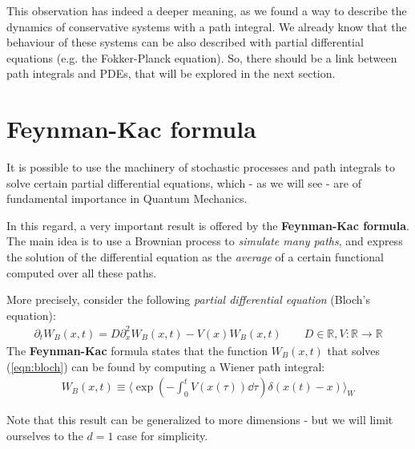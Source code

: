 \documentclass[../template.tex]{subfiles}
\begin{document}
 \medskip

 This observation has indeed a deeper meaning, as we found a way to describe the dynamics of conservative systems with a path integral. We already know that the behaviour of these systems can be also described with partial differential equations (e.g. the Fokker-Planck equation). So, there should be a link between path integrals and PDEs, that will be explored in the next section.

\section{Feynman-Kac formula}
It is possible to use the machinery of stochastic processes and path integrals to solve certain partial differential equations, which - as we will see - are of fundamental importance in Quantum Mechanics.

In this regard, a very important result is offered by the \textbf{Feynman-Kac formula}. The main idea is to use a Brownian process to \textit{simulate many paths}, and express the solution of the differential equation as the \textit{average} of a certain functional computed over all these paths. 

More precisely, consider the following \textit{partial differential equation} (Bloch's equation): 
\begin{align}
    \partial_t W_B(x,t) = D \partial_x^2 W_B(x,t) - V(x) W_B(x,t) \qquad D \in \mathbb{R}, V\colon \mathbb{R} \to \mathbb{R}  
    \label{eqn:bloch}
\end{align}
The \textbf{Feynman-Kac} formula states that the function $W_B(x,t)$ that solves (\ref{eqn:bloch}) can be found by computing a Wiener path integral: 
\begin{align}
    W_B(x,t) \equiv \langle \exp\left(-\int_0^t V(x(\tau)) \dd{\tau}\right) \delta(x(t) - x) \rangle_W
    \label{eqn:Wb}
\end{align}

Note that this result can be generalized to more dimensions - but we will limit ourselves to the $d=1$ case for simplicity.

\medskip
\end{document}
